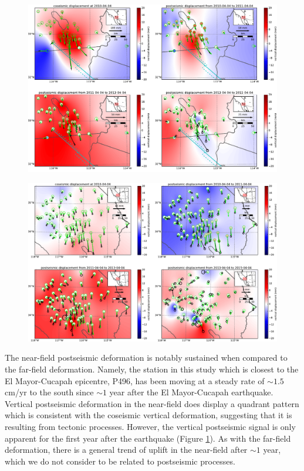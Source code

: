 \documentclass[1p]{elsarticle}
\begin{document}
\begin{figure}
\includegraphics[scale=0.7]{Figures/MapViewNearField}
\centering 
\caption{}
\label{fig:NearField}
\end{figure}

\begin{figure}
\includegraphics[scale=0.7]{Figures/MapViewFarField}
\centering 
\caption{}
\label{fig:FarField}
\end{figure}

The near-field postseismic deformation is notably sustained when compared to the far-field deformation.  Namely, the station in this study which is closest to the El Mayor-Cucapah epicentre, P496, has been moving at a steady rate of $\sim1.5$ cm/yr to the south since $\sim1$ year after the El Mayor-Cucapah earthquake.  Vertical postseismic deformation in the near-field does display a quadrant pattern which is consistent with the coseismic vertical deformation, suggesting that it is resulting from tectonic processes.  However, the vertical postseismic signal is only apparent for the first year after the earthquake (Figure \ref{fig:NearField}).  As with the far-field deformation, there is a general trend of uplift in the near-field after $\sim1$ year, which we do not consider to be related to postseismic processes.  
\end{document}
